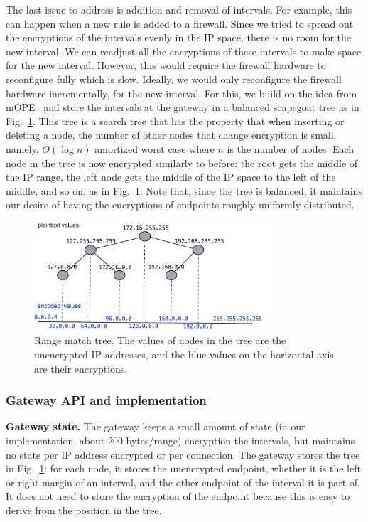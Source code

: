 The last issue to address is addition and removal of intervals. For example, this can happen when a new rule is added to a firewall. 
Since we tried to spread out the encryptions of the intervals evenly in the IP space, there is no room for the new interval. We can 
readjust all the encryptions of these intervals to make space for the new interval. However, this would require the firewall hardware to reconfigure fully which is slow. Ideally, we would only reconfigure the firewall hardware incrementally, for the new interval. For this, we build on the idea from mOPE~\cite{popa:mope} and store the intervals at the gateway in a balanced scapegoat tree as in Fig.~\ref{fig:tree}. This tree is a search tree that has the property that when inserting or deleting a node, the number of other nodes that change encryption is small, namely, $O(\log n)$ amortized worst case where $n$ is the number of nodes. Each node in the tree is now encrypted similarly to before: the root gets the middle of the IP range,  the left node gets the middle of the IP space to the left of the middle, and so on, as in Fig.~\ref{fig:tree}.  Note that, since the tree is balanced, it maintains our desire of having the encryptions of endpoints roughly uniformly distributed.

\begin{figure}
  \includegraphics[width=3.45in]{fig/tree}
  \caption{\label{fig:tree} Range match tree. The values of nodes in the tree are the unencrypted IP addresses, and the blue values on the horizontal axis are their encryptions. }
\end{figure}




\subsubsection{Gateway API and implementation}\label{s:rangealg}

\noindent\textbf{Gateway state.} The gateway keeps a small amount of state (in our implementation, about 200 bytes/range) encryption the intervals, but maintains no state per IP address encrypted or per connection. The gateway stores the tree in Fig.~\ref{fig:tree}: for each node, it stores the unencrypted endpoint, whether it is the left or  right margin of an interval, and the other endpoint of the interval it is part of. It does not need to store the encryption of the endpoint because this is easy to derive from the position in the tree. 


